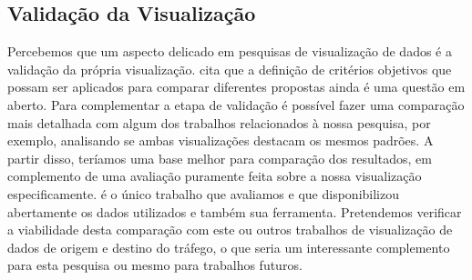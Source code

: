 %  
%
%
%
%
%

\subsection{Validação da Visualização}

 Percebemos que um aspecto delicado em pesquisas de visualização de dados é a
validação da própria visualização. \citet{Telea2018} cita que a definição de
critérios objetivos que possam ser aplicados para comparar diferentes propostas
ainda é uma questão em aberto. Para complementar a etapa de validação é
possível fazer uma comparação mais detalhada com algum dos trabalhos
relacionados à nossa pesquisa, por exemplo, analisando se ambas visualizações
destacam os mesmos padrões. A partir disso, teríamos uma base melhor para
comparação dos resultados, em complemento de uma avaliação puramente feita
sobre a nossa visualização especificamente.  \citet{Guo2011} é o único trabalho
que avaliamos e que disponibilizou abertamente os dados utilizados e também sua
ferramenta.  Pretendemos verificar a viabilidade desta comparação com este ou
outros trabalhos de visualização de dados de origem e destino do tráfego, o que
seria um interessante complemento para esta pesquisa ou mesmo para trabalhos
futuros.

